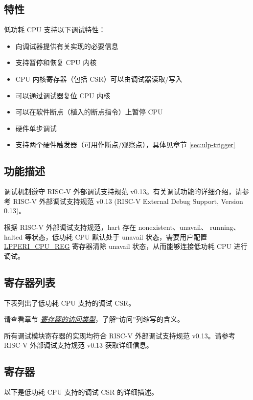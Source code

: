\documentclass[main\_\_CN.tex]{subfiles}
\begin{document}
\subsection{特性}
低功耗 CPU 支持以下调试特性：
\begin{itemize}
    \item {向调试器提供有关实现的必要信息}
    \item {支持暂停和恢复 CPU 内核}
    \item {CPU 内核寄存器（包括 CSR）可以由调试器读取/写入}
    \item {可以通过调试器复位 CPU 内核}
    \item {可以在软件断点（植入的断点指令）上暂停 CPU}
    \item {硬件单步调试}
    \item {支持两个硬件触发器（可用作断点/观察点），具体见章节 \ref{sec:ulp-trigger}}
\end{itemize}

\subsection{功能描述}
调试机制遵守 RISC-V 外部调试支持规范 v0.13。有关调试功能的详细介绍，请参考 RISC-V 外部调试支持规范 v0.13 (RISC-V External Debug Support, Version 0.13)。

根据 RISC-V 外部调试支持规范，hart 存在 nonexistent、unavail、 running、halted 等状态，低功耗 CPU 默认处于 unavail 状态，需要用户配置 \hyperref[regdesc:LPPERICPUREG]{LPPERI\_CPU\_REG} 寄存器清除 unavail 状态，从而能够连接低功耗 CPU 进行调试。

\subsection{寄存器列表}

下表列出了低功耗 CPU 支持的调试 CSR。

请查看章节 \hyperref[glossary-access-types]{\textit{寄存器的访问类型}}，了解“访问”列缩写的含义。



所有调试模块寄存器的实现均符合 RISC-V 外部调试支持规范 v0.13。请参考 RISC-V 外部调试支持规范 v0.13 获取详细信息。

\subsection{寄存器}
以下是低功耗 CPU 支持的调试 CSR 的详细描述。
\end{document}
